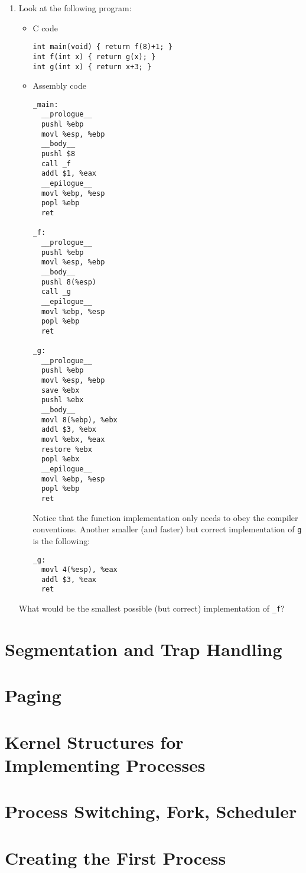 \begin{enumerate}
\item Look at the following program:
\begin{itemize}
\item C code
\begin{verbatim}
int main(void) { return f(8)+1; }
int f(int x) { return g(x); }
int g(int x) { return x+3; }
\end{verbatim}
\item Assembly code
\begin{verbatim}
_main:
  __prologue__
  pushl %ebp
  movl %esp, %ebp
  __body__
  pushl $8
  call _f
  addl $1, %eax
  __epilogue__
  movl %ebp, %esp
  popl %ebp
  ret

_f:
  __prologue__
  pushl %ebp
  movl %esp, %ebp
  __body__
  pushl 8(%esp)
  call _g
  __epilogue__
  movl %ebp, %esp
  popl %ebp
  ret

_g:
  __prologue__
  pushl %ebp
  movl %esp, %ebp
  save %ebx
  pushl %ebx
  __body__
  movl 8(%ebp), %ebx
  addl $3, %ebx
  movl %ebx, %eax
  restore %ebx
  popl %ebx
  __epilogue__
  movl %ebp, %esp
  popl %ebp
  ret
\end{verbatim}
Notice that the function implementation only needs to obey the compiler conventions.
Another smaller (and faster) but correct implementation of {\tt g} is the following:
\begin{verbatim}
_g:
  movl 4(%esp), %eax
  addl $3, %eax
  ret
\end{verbatim}
\end{itemize}
What would be the smallest possible (but correct) implementation of {\tt \_f}?
\end{enumerate}

\section{Segmentation and Trap Handling}
\section{Paging}
\section{Kernel Structures for Implementing Processes}
\section{Process Switching, Fork, Scheduler}
\section{Creating the First Process}
